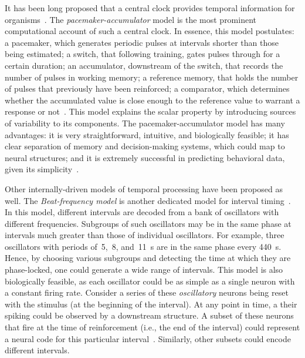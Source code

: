 It has been long proposed that a central clock provides temporal information for organisms~\cite{gibbon1984AnnalsNYAS, Killeen1988}.
The \emph{pacemaker-accumulator} model is the most prominent computational account of such a central clock.
In essence, this model postulates:
    a pacemaker, which generates periodic pulses at intervals shorter than those being estimated;
    a switch, that following training, gates pulses through for a certain duration;
    an accumulator, downstream of the switch, that records the number of pulses in working memory;
    a reference memory, that holds the number of pulses that previously have been reinforced;
    a comparator, which determines whether the accumulated value is close enough to the reference value to warrant a response or not~\cite{gibbon1984AnnalsNYAS}.
This model explains the scalar property by introducing sources of variability to its components.
The pacemaker-accumulator model has many advantages:
    it is very straightforward, intuitive, and biologically feasible;
    it has clear separation of memory and decision-making systems, which could map to neural structures;
    and it is extremely successful in predicting behavioral data, given its simplicity~\cite{Buhusi2005NatRevNeuro}.
\par
Other internally-driven models of temporal processing have been proposed as well.
The \emph{Beat-frequency model} is another dedicated model for interval timing~\cite{Paton2018NeuronRev}.
In this model, different intervals are decoded from a bank of oscillators with different frequencies.
Subgroups of such oscillators may be in the same phase at intervals much greater than those of individual oscillators.
For example, three oscillators with periods of~5,~8, and~11~s are in the same phase every 440~s.\footnotemark
{}
Hence, by choosing various subgroups and detecting the time at which they are phase-locked, one could generate a wide range of intervals.
This model is also biologically feasible, as each oscillator could be as simple as a single neuron with a constant firing rate.
Consider a series of these \textit{oscillatory} neurons being reset with the stimulus (at the beginning of the interval).
At any point in time, a their spiking could be observed by a downstream structure.
A subset of these neurons that fire at the time of reinforcement (i.e., the end of the interval) could represent a neural code for this particular interval~\cite{Matell2004CogBrainRes}.
Similarly, other subsets could encode different intervals.
